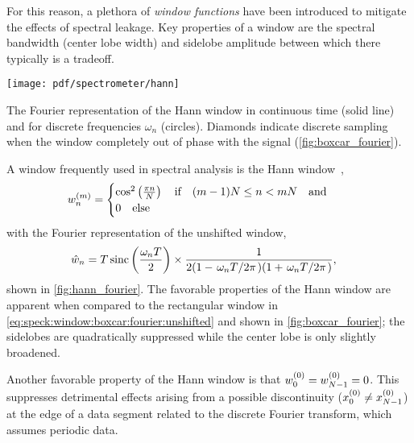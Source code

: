 For this reason, a plethora of \emph{window functions} have been introduced to mitigate the effects of spectral leakage.
Key properties of a window are the spectral bandwidth (center lobe width) and sidelobe amplitude between which there typically is a tradeoff.
\begin{marginfigure}
    \centering
    \texttt{[image: pdf/spectrometer/hann]}
    \caption{
        The Fourier representation of the Hann window in continuous time (solid line) and for discrete frequencies $\omega_n$ (circles).
        Diamonds indicate discrete sampling when the window completely out of phase with the signal (\cf \cref{fig:boxcar_fourier}).
    }
    \label{fig:hann_fourier}
\end{marginfigure}
A window frequently used in spectral analysis is the Hann window~\cite{Nuttall1981},
\begin{align}\label{eq:speck:window:hann}
    w_n\gth{m} =
    \begin{cases}
        \cos^2\left(\frac{\pi n}{N}\right)\qif (m - 1)N\leq n < mN\qand \\
        0\qelse
    \end{cases}
\end{align}
with the Fourier representation of the unshifted window,
\begin{align}\label{eq:speck:window:hann:fourier_unshifted}
    \hat{w}_n &=  T\sinc\left(\frac{\omega_n T}{2}\right)\times
                    \frac{1}{2(1 - \flatfrac{\omega_n T}{2\pi})(1 + \flatfrac{\omega_n T}{2\pi})},
\end{align}
shown in \cref{fig:hann_fourier}.
The favorable properties of the Hann window are apparent when compared to the rectangular window in \cref{eq:speck:window:boxcar:fourier:unshifted} and shown in \cref{fig:boxcar_fourier}; the sidelobes are quadratically suppressed while the center lobe is only slightly broadened.

Another favorable property of the Hann window is that $w_0^{(0)} = w_{N-1}^{(0)} = 0$.
This suppresses detrimental effects arising from a possible discontinuity ($x_0^{(0)}\neq x_{N-1}^{(0)}$) at the edge of a data segment related to the discrete Fourier transform, which assumes periodic data.

